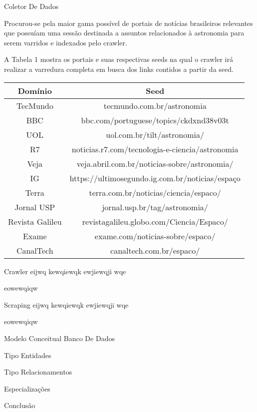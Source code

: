 \documentclass{article}
\begin{document}
\begin{section}{Coletor De Dados}

Procurou-se pela maior gama possível de portais de notícias brasileiros relevantes que possuíam uma sessão destinada a assuntos relacionados à astronomia para serem varridos e indexados pelo crawler.

A Tabela 1 mostra os portais e suas respectivas seeds na qual o crawler irá realizar a varredura completa em busca dos links contidos a partir da seed.


\begin{tabular}{|c|c|}
\hline
Domínio & Seed\\\hline
TecMundo & tecmundo.com.br/astronomia \\\hline
BBC & bbc.com/portuguese/topics/ckdxnd38v03t\\\hline
UOL & uol.com.br/tilt/astronomia/\\\hline
R7 & noticias.r7.com/tecnologia-e-ciencia/astronomia \\\hline
Veja & veja.abril.com.br/noticias-sobre/astronomia/ \\\hline
IG & https://ultimosegundo.ig.com.br/noticias/espaço \\\hline
Terra & terra.com.br/noticias/ciencia/espaco/\\\hline
Jornal USP & jornal.usp.br/tag/astronomia/\\\hline
Revista Galileu & revistagalileu.globo.com/Ciencia/Espaco/\\\hline
Exame & exame.com/noticias-sobre/espaco/\\\hline
CanalTech & canaltech.com.br/espaco/\\\hline
\end{tabular}

\begin{subsection}{Crawler}
				eijwq kewqiewqk ewjiewqji wqe

				eowewqiqw
\end{subsection}

\begin{subsection}{Scraping}
				eijwq kewqiewqk ewjiewqji wqe

				eowewqiqw
\end{subsection}
\end{section}

\begin{section}{Modelo Conceitual Banco De Dados}

\begin{subsection}{Tipo Entidades}

\end{subsection}
\begin{subsection}{Tipo Relacionamentos}

\end{subsection}
\begin{subsection}{Especializações}
\end{subsection}


\end{section}
\begin{section}{Conclusão}

\end{section}
\end{document}
